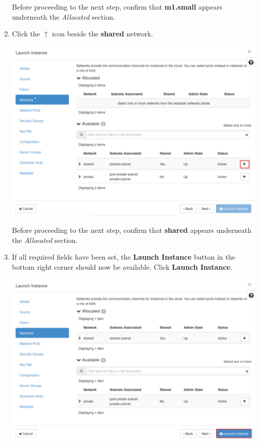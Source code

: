 \documentclass[letterpaper, 12pt]{article}
\begin{document}
\begin{enumerate}
    \begin{stopbox}
        Before proceeding to the next step, confirm that \textbf{m1.small} appears underneath the \textit{Allocated} section.
    \end{stopbox}

    \item Click the $\uparrow$ icon beside the \textbf{shared} network.

    \begin{center}
        \includegraphics[width=\linewidth]{images/part1/step9.png}
    \end{center}

    \begin{stopbox}
        Before proceeding to the next step, confirm that \textbf{shared} appears underneath the \textit{Allocated} section.
    \end{stopbox}

    \item If all required fields have been set, the \textbf{Launch Instance} button in the bottom right corner should now be available.
    Click \textbf{Launch Instance}.

    \begin{center}
        \includegraphics[width=\linewidth]{images/part1/step10.png}
    \end{center}


\end{enumerate}
\end{document}
